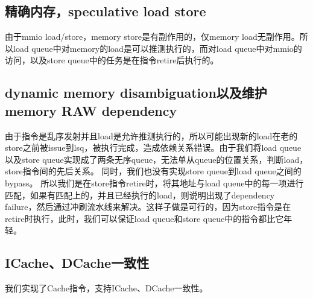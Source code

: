 \documentclass[lang=cn,11pt,a4paper]{elegantpaper}
\begin{document}
\subsection{精确内存，speculative load store}
由于mmio load/store，memory store是有副作用的，仅memory load无副作用。所以load queue中对memory的load是可以推测执行的，而对load queue中对mmio的访问，以及store queue中的任务是在指令retire后执行的。


\subsection{dynamic memory disambiguation以及维护memory RAW dependency}
由于指令是乱序发射并且load是允许推测执行的，所以可能出现新的load在老的store之前被issue到lsq，被执行完成，造成依赖关系错误。由于我们将load queue以及store queue实现成了两条无序queue，无法单从queue的位置关系，判断load，store指令间的先后关系。
同时，我们也没有实现store queue到load queue之间的bypass。
所以我们是在store指令retire时，将其地址与load queue中的每一项进行匹配，如果有匹配上的，并且已经执行的load，则说明出现了dependency failure，然后通过冲刷流水线来解决。这样子做是可行的，因为store指令是在retire时执行，此时，我们可以保证load queue和store queue中的指令都比它年轻。

\subsection{ICache、DCache一致性}
我们实现了Cache指令，支持ICache、DCache一致性。
\end{document}
